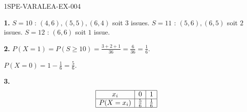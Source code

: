 \begin{corrige}{1SPE-VARALEA-EX-004}

\textbf{1.} $S=10$ : $(4,6),(5,5),(6,4)$ soit $3$ issues. $S=11$ : $(5,6),(6,5)$ soit $2$ issues. $S=12$ : $(6,6)$ soit $1$ issue.

\medskip
\textbf{2.} $P(X=1) = P(S \geq 10) = \frac{3+2+1}{36} = \frac{6}{36} = \frac{1}{6}$.

$P(X=0) = 1 - \frac{1}{6} = \frac{5}{6}$.

\medskip
\textbf{3.}
\[
\begin{array}{|c|c|c|}
\hline
x_i & 0 & 1 \\
\hline
P(X=x_i) & \frac{5}{6} & \frac{1}{6} \\
\hline
\end{array}
\]

\end{corrige}
